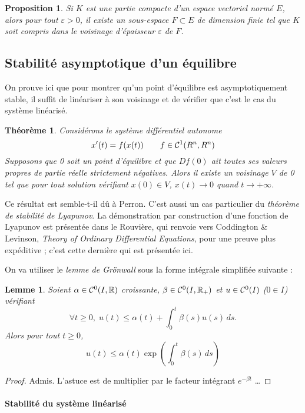 \documentclass[a4paper, 11pt]{article}
\def\R{\mathbb{R}}
\def\Cf{{\cal{C}}}
\newtheorem*{proposition}{Proposition}
\newtheorem*{theorem}{Théorème}
\newtheorem*{lemma}{Lemme}
\begin{document}
\begin{proposition}
  Si $K$ est une partie compacte d'un espace vectoriel normé $E$, alors pour
  tout $\varepsilon > 0$, il existe un sous-espace $F \subset E$ de dimension
  finie tel que $K$ soit compris dans le voisinage d'épaisseur $\varepsilon$ de
  $F$.
\end{proposition}

\newpage

\subsection{Stabilité asymptotique d'un équilibre}

On prouve ici que pour montrer qu'un point d'équilibre est asymptotiquement
stable, il suffit de linéariser à son voisinage et de vérifier que c'est le cas
du système linéarisé.

\begin{theorem}
  Considérons le système différentiel autonome
  \[ x'(t) = f(x(t)) \qquad f \in \Cf^1(R^n, R^n)  \]
  Supposons que 0 soit un point d'équilibre et que $Df(0)$ ait toutes ses
  valeurs propres de partie réelle strictement négatives. Alors il existe un
  voisinage $V$ de 0 tel que pour tout solution vérifiant $x(0) \in V$, $x(t)
  \to 0$ quand $t \to +\infty$.
\end{theorem}

Ce résultat est semble-t-il dû à Perron. C'est aussi un cas particulier du
\emph{théorème de stabilité de Lyapunov}. La démonstration par construction
d'une fonction de Lyapunov est présentée dans le Rouvière, qui renvoie vers
Coddington \& Levinson, \emph{Theory of Ordinary Differential Equations}, pour
une preuve plus expéditive ; c'est cette dernière qui est présentée ici.

On va utiliser le \emph{lemme de Grönwall} sous la forme intégrale simplifiée
suivante :
\begin{lemma}
  Soient $\alpha \in \Cf^0(I, \R)$ croissante, $\beta \in \Cf^0(I, \R_+)$ et $u
  \in \Cf^0(I)$ ($0 \in I$) vérifiant
  \[ \forall t \geq 0,\; u(t) \leq \alpha(t) + \int_0^t \beta(s)u(s)\,ds.  \]
  Alors pour tout $t \geq 0$,
  \[ u(t) \leq \alpha(t) \exp\left(\int_0^t \beta(s)\,ds\right) \]
\end{lemma}
\begin{proof}
  Admis. L'astuce est de multiplier par le facteur intégrant $e^{-\beta t}$ …
\end{proof}

\paragraph{Stabilité du système linéarisé}
\end{document}
